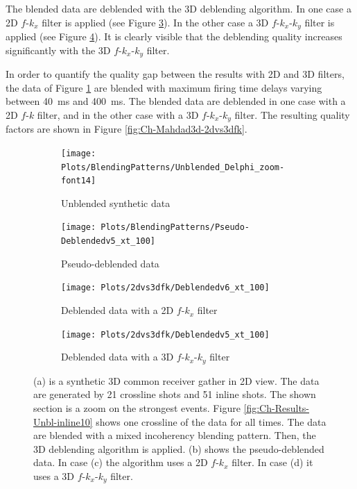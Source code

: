 The blended data are deblended with the 3D deblending algorithm. In one case a 2D $f$-$k_x$ filter is applied (see Figure \ref{fig:Ch-Mahdad3d-Deblending-2dfk}). In the other case a 3D $f$-$k_x$-$k_y$ filter is applied (see Figure \ref{fig:Ch-Mahdad3d-Deblending-3dfk}). It is clearly visible that the deblending quality increases significantly with the 3D $f$-$k_x$-$k_y$ filter.

In order to quantify the quality gap between the results with 2D and 3D filters, the data of Figure \ref{fig:Ch-Mahdad3d-Unbl-Delphi} are blended with maximum firing time delays varying between \SI{40}{\milli\second} and \SI{400}{\milli\second}. The blended data are deblended in one case with a 2D $f$-$k$ filter, and in the other case with a 3D $f$-$k_x$-$k_y$ filter. The resulting quality factors are shown in Figure \ref{fig:Ch-Mahdad3d-2dvs3dfk}.

 
\begin{figure}
	
	\centering
	\begin{subfigure}[t]{0.8\textwidth}
		\centering
		\texttt{[image: Plots/BlendingPatterns/Unblended\_Delphi\_zoom-font14]}
		\caption{Unblended synthetic data}
		\label{fig:Ch-Mahdad3d-Unbl-Delphi}
	\end{subfigure}

	\par\bigskip
	
	\centering
	\begin{subfigure}[t]{0.8\textwidth}
		\texttt{[image: Plots/BlendingPatterns/Pseudo-Deblendedv5\_xt\_100]}
		\caption{Pseudo-deblended data}
		\label{fig:Ch-Mahdad3d-Deblending-Pseudo-Zoom}
	\end{subfigure}
	
	\par\bigskip

	\centering
	\begin{subfigure}[t]{0.8\textwidth}
		\texttt{[image: Plots/2dvs3dfk/Deblendedv6\_xt\_100]}
		\caption{Deblended data with a 2D $f$-$k_x$ filter}
		\label{fig:Ch-Mahdad3d-Deblending-2dfk}
	\end{subfigure}
	
	\par\bigskip
	
	\centering
	\begin{subfigure}[t]{0.8\textwidth}
		\texttt{[image: Plots/2dvs3dfk/Deblendedv5\_xt\_100]}
		\caption{Deblended data with a 3D $f$-$k_x$-$k_y$ filter}
		\label{fig:Ch-Mahdad3d-Deblending-3dfk}
	\end{subfigure}
	
	\caption{(a) is a synthetic 3D common receiver gather in 2D view. The data are generated by 21 crossline shots and 51 inline shots. The shown section is a zoom on the strongest events. Figure \ref{fig:Ch-Results-Unbl-inline10} shows one crossline of the data for all times. The data are blended with a mixed incoherency blending pattern. Then, the 3D deblending algorithm is applied. (b) shows the pseudo-deblended data. In case (c) the algorithm uses a 2D $f$-$k_x$ filter. In case (d) it uses a 3D $f$-$k_x$-$k_y$ filter.}
	\label{fig:Ch-Mahdad3d-Deblending-2dvs3d-fk}
	
\end{figure}


